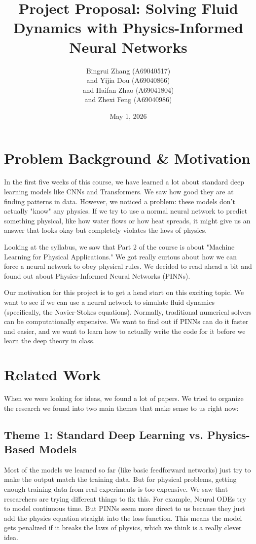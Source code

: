 \documentclass[11pt,a4paper]{article}
\title{\vspace{-2cm}\textbf{Project Proposal: Solving Fluid Dynamics with Physics-Informed Neural Networks}}
\author{Bingrui Zhang (A69040517) \\and Yijia Dou (A69040866) \\and Haifan Zhao (A69041804) \\and Zhexi Feng (A69040986)}
\date{May 1, 2026}
\begin{document}
\maketitle

\section{Problem Background \& Motivation}

In the first five weeks of this course, we have learned a lot about standard deep learning models like CNNs and Transformers. We saw how good they are at finding patterns in data. However, we noticed a problem: these models don't actually "know" any physics. If we try to use a normal neural network to predict something physical, like how water flows or how heat spreads, it might give us an answer that looks okay but completely violates the laws of physics.

Looking at the syllabus, we saw that Part 2 of the course is about "Machine Learning for Physical Applications." We got really curious about how we can force a neural network to obey physical rules. We decided to read ahead a bit and found out about Physics-Informed Neural Networks (PINNs). 

Our motivation for this project is to get a head start on this exciting topic. We want to see if we can use a neural network to simulate fluid dynamics (specifically, the Navier-Stokes equations). Normally, traditional numerical solvers can be computationally expensive. We want to find out if PINNs can do it faster and easier, and we want to learn how to actually write the code for it before we learn the deep theory in class.

\section{Related Work}

When we were looking for ideas, we found a lot of papers. We tried to organize the research we found into two main themes that make sense to us right now:

\subsection*{Theme 1: Standard Deep Learning vs. Physics-Based Models}
Most of the models we learned so far (like basic feedforward networks) just try to make the output match the training data. But for physical problems, getting enough training data from real experiments is too expensive. We saw that researchers are trying different things to fix this. For example, Neural ODEs try to model continuous time. But PINNs seem more direct to us because they just add the physics equation straight into the loss function. This means the model gets penalized if it breaks the laws of physics, which we think is a really clever idea.
\end{document}
